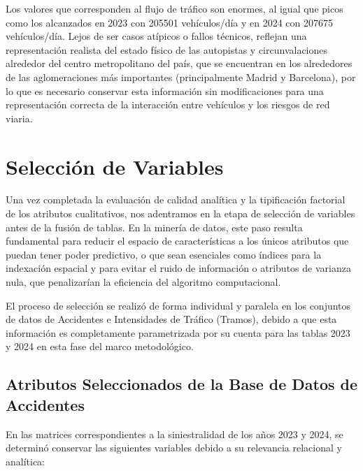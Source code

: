 \documentclass[twoside,a4paper,12pt,onecolumn,openany]{book}
\begin{document}
Los valores que corresponden al flujo de tráfico son enormes, al igual que picos como los alcanzados en 2023 con 205501 vehículos/día y en 2024 con 207675 vehículos/día. Lejos de ser casos atípicos o fallos técnicos, reflejan una representación realista del estado físico de las autopistas y circunvalaciones alrededor del centro metropolitano del país, que se encuentran en los alrededores de las aglomeraciones más importantes (principalmente Madrid y Barcelona), por lo que es necesario conservar esta información sin modificaciones para una representación correcta de la interacción entre vehículos y los riesgos de red viaria. 

\section{Selección de Variables}

Una vez completada la evaluación de calidad analítica y la tipificación factorial de los atributos cualitativos, nos adentramos en la etapa de selección de variables antes de la fusión de tablas. En la minería de datos, este paso resulta fundamental para reducir el espacio de características a los únicos atributos que puedan tener  poder predictivo, o que sean esenciales como índices para la indexación espacial  y para evitar el ruido de información  o atributos de varianza nula, que penalizarían   la eficiencia  del algoritmo computacional.

\vspace{0.5cm}

El proceso de selección se realizó de forma individual y paralela en los conjuntos de datos de Accidentes e Intensidades de Tráfico (Tramos), debido a que esta información es completamente parametrizada por su cuenta para las tablas 2023 y 2024 en esta fase del marco metodológico.

\subsection{Atributos Seleccionados de la Base de Datos de Accidentes}

En las matrices correspondientes a la siniestralidad de los años 2023 y 2024, se determinó conservar las siguientes variables debido a su relevancia relacional y analítica:
\end{document}
